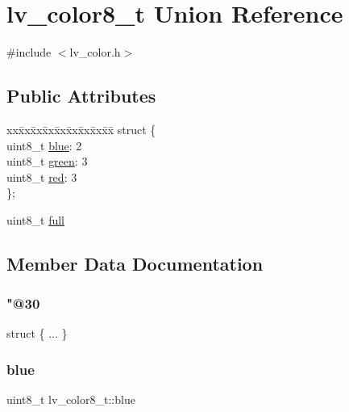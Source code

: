 \hypertarget{unionlv__color8__t}{}\section{lv\+\_\+color8\+\_\+t Union Reference}
\label{unionlv__color8__t}


{\ttfamily \#include $<$lv\+\_\+color.\+h$>$}

\subsection*{Public Attributes}
\begin{DoxyCompactItemize}
\item 
\begin{tabbing}
xx\=xx\=xx\=xx\=xx\=xx\=xx\=xx\=xx\=\kill
struct \{\\
\>uint8\_t \mbox{\hyperlink{unionlv__color8__t_a13f6fe7fdd8d49b75e06a022146464e3}{blue}}: 2\\
\>uint8\_t \mbox{\hyperlink{unionlv__color8__t_a77f8631c3f09bbf7f6d96c8415085517}{green}}: 3\\
\>uint8\_t \mbox{\hyperlink{unionlv__color8__t_abed658f0eaf8cee7278869ad88246d68}{red}}: 3\\
\}; \\

\end{tabbing}\item 
uint8\+\_\+t \mbox{\hyperlink{unionlv__color8__t_a6f95b496bba6bb7b79d7322551219ba7}{full}}
\end{DoxyCompactItemize}


\subsection{Member Data Documentation}
\mbox{\label{unionlv__color8__t_aa2fce848139d740c920c895540e7c16b}} 
\subsubsection{\texorpdfstring{"@30}{@30}}
{\footnotesize\ttfamily struct \{ ... \} }

\mbox{\label{unionlv__color8__t_a13f6fe7fdd8d49b75e06a022146464e3}} 
\subsubsection{\texorpdfstring{blue}{blue}}
{\footnotesize\ttfamily uint8\+\_\+t lv\+\_\+color8\+\_\+t\+::blue}

